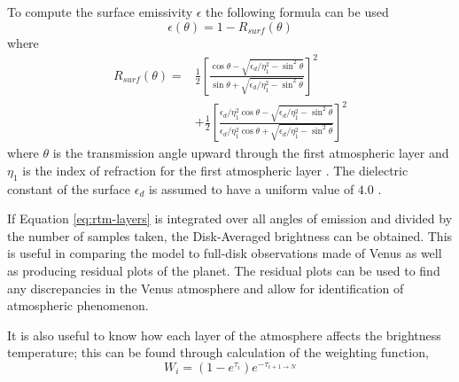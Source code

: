 To compute the surface emissivity $\epsilon$ the following formula can be used
\begin{equation}\label{eq:rtm-esurf}
\epsilon(\theta) = 1-R_{surf}(\theta)
\end{equation}
where
\begin{equation}\label{eq:rtm-rsurf}
\begin{split}
R_{surf}(\theta) =& \frac{1}{2} \left[ \frac{\cos\theta - \sqrt{\epsilon_d/\eta_1^2-\sin^2\theta}}{\sin\theta + \sqrt{\epsilon_d/\eta_1^2-\sin^2\theta}} \right]^2\\
&+\frac{1}{2} \left[ \frac{\epsilon_d/\eta_1^2 \cos\theta - \sqrt{\epsilon_d/\eta_1^2-\sin^2\theta}}{\epsilon_d/\eta_1^2 \cos\theta + \sqrt{\epsilon_d/\eta_1^2-\sin^2\theta}} \right]^2
\end{split}
\end{equation}
where $\theta$ is the transmission angle upward through the first atmospheric layer and $\eta_1$ is the index of refraction for the first atmospheric layer \cite{Jenkins-2002}. The dielectric constant of the surface $\epsilon_d$ is assumed to have a uniform value of $4.0$ \cite{Pettengill-1992}.

If Equation \ref{eq:rtm-layers} is integrated over all angles of emission and divided by the number of samples taken, the Disk-Averaged brightness can be obtained. This is useful in comparing the model to full-disk observations made of Venus as well as producing residual plots of the planet. The residual plots can be used to find any discrepancies in the Venus atmosphere and allow for identification of atmospheric phenomenon. 

It is also useful to know how each layer of the atmosphere affects the brightness temperature; this can be found through calculation of the weighting function,
\begin{equation}
W_i = (1-e^{\tau_i}) e^{-\tau_{i+1 \rightarrow N}}
\end{equation}











